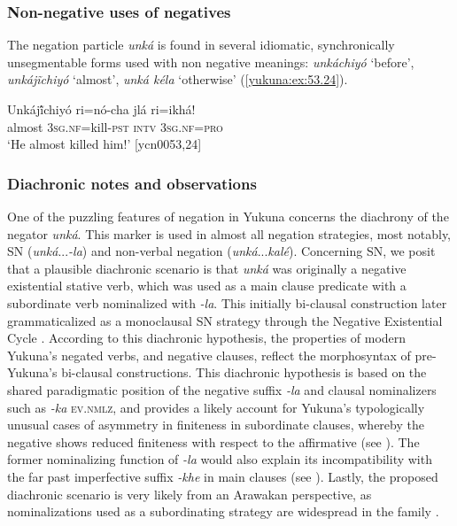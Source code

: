 \documentclass[output=paper,colorlinks,citecolor=brown]{langscibook}
\begin{document}
\subsubsection{Non-negative uses of negatives}

The negation particle \textit{unká} is found in several idiomatic, synchronically unsegmentable forms used with non negative meanings: \textit{unkáchiyó} ‘before’, \textit{unkájĩchiyó}  ‘almost’, \textit{unká kéla} ‘otherwise’ (\ref{yukuna:ex:53.24}).

\ea\label{yukuna:ex:53.24}
\gll Unkájĩ́chiyó ri=nó-cha jlá ri=ikhá!\\
almost \textsc{3sg.nf}=kill-\textsc{pst} \textsc{intv} \textsc{3sg.nf=pro} \\
\glt ‘He almost killed him!’  [ycn0053,24]
\z

\subsubsection{Diachronic notes and observations}\label{yukuna:diachrony}

One of the puzzling features of negation in Yukuna concerns the diachrony of the negator \textit{unká}. This marker is used in almost all negation strategies, most notably, SN (\textit{unká}{...}\textit{-la}) and non-verbal negation (\textit{unká}{...}\textit{kalé}). 
Concerning SN, we posit that a plausible diachronic scenario is that \textit{unká} was originally a negative existential stative verb, which was used as a main clause predicate with a subordinate verb nominalized with \textit{-la}. This initially bi-clausal construction later grammaticalized as a monoclausal SN strategy through the Negative Existential Cycle \citep{Veselinova2016}. According to this diachronic hypothesis, the properties of modern Yukuna's negated verbs, and negative clauses, reflect the morphosyntax of pre-Yukuna's bi-clausal constructions. This diachronic hypothesis is based on the shared paradigmatic position of the negative suffix \textit{-la} and clausal nominalizers such as \textit{-ka} \textsc{ev.nmlz}, and provides a likely account for Yukuna's typologically unusual cases of asymmetry in finiteness in subordinate clauses, whereby the negative shows reduced finiteness with respect to the affirmative (see ). The former nominalizing function of \textit{-la} would also explain its incompatibility with the far past imperfective suffix \textit{-khe} in main clauses (see ). Lastly, the proposed diachronic scenario is very likely from an Arawakan perspective, as nominalizations used as a subordinating strategy are widespread in the family \citep[100]{Aikhenvald1999}.
\end{document}
